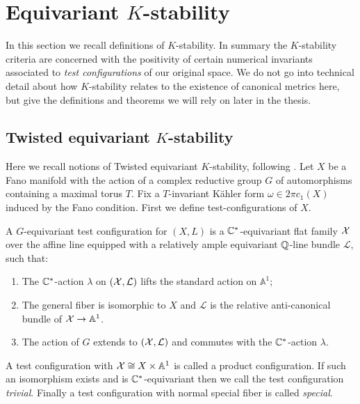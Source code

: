 \section{Equivariant $K$-stability} \label{sec:eqKstab}
In this section we recall definitions of \(K\)-stability. In summary the \(K\)-stability criteria are concerned with the positivity of certain numerical invariants associated to \textit{test configurations} of our original space. We do not go into technical detail about how \(K\)-stability relates to the existence of canonical metrics here, but give the definitions and theorems we will rely on later in the thesis.
\subsection{Twisted equivariant $K$-stability}
\label{prelim:twisted}
Here we recall notions of Twisted equivariant $K$-stability, following \cite{datar2016kahler}. Let \(X\) be a Fano manifold with the action of a complex reductive group \(G\) of automorphisms containing a maximal torus \(T\). Fix a \(T\)-invariant K\"ahler form \(\omega \in 2 \pi c_1(X)\) induced by the Fano condition. First we define test-configurations of \(X\).
\begin{definition}
A \(G\)-equivariant test configuration for \((X,L)\) is a \(\mathbb{C}^*\)-equivariant flat family \({\mathcal{X}}\) over the affine line equipped with a relatively ample equivariant \(\mathbb{Q}\)-line bundle \(\mathcal{L}\), such that:
\begin{enumerate}
\item The \(\mathbb{C}^*\)-action \(\lambda\) on \(({\mathcal{X}}, \mathcal{L})\) lifts the standard action on \(\mathbb{A}^1\);
\item The general fiber is isomorphic to \(X\) and \(\mathcal{L}\) is the relative anti-canonical bundle of \({\mathcal{X}} \to \mathbb{A}^1\).
\item The action of \(G\) extends to \(({\mathcal{X}},\mathcal{L})\) and commutes with the \(\mathbb{C}^*\)-action \(\lambda\).
\end{enumerate}
\end{definition}
A test configuration with \({\mathcal{X}} \cong X \times \mathbb{A}^1\) is called a product configuration. If such an isomorphism exists and is \(\mathbb{C}^*\)-equivariant then we call the test configuration \textit{trivial}. Finally a test configuration with normal special fiber is called \textit{special}.

